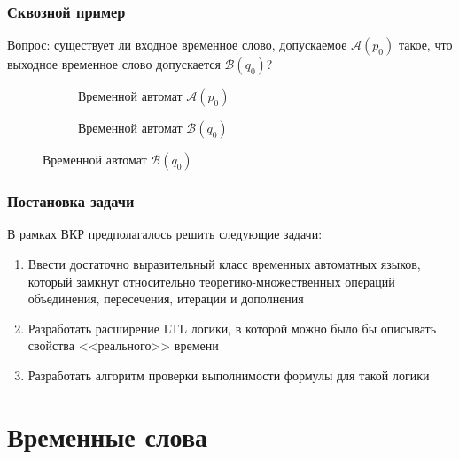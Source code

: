 \documentclass{beamer}
\begin{document}
\begin{frame}
\frametitle{Сквозной пример}



Вопрос: существует ли входное временное слово, допускаемое $\mathcal{A}(p_0)$ такое, что выходное временное слово допускается $\mathcal{B}(q_0)$?


\begin{figure}
\centering
\begin{subfigure}{.5\textwidth}
  \centering

  \caption{Временной автомат $\mathcal{A}(p_0)$}
\end{subfigure}%
\begin{subfigure}{.5\textwidth}
  \centering
  \caption{Временной автомат $\mathcal{B}(q_0)$}
\end{subfigure}
\end{figure}

\end{frame}

\begin{frame}
\frametitle{Постановка задачи}

В рамках ВКР предполагалось решить следующие задачи:
\begin{enumerate}
	\item Ввести достаточно выразительный класс временных автоматных языков, который замкнут относительно теоретико-множественных операций объединения, пересечения, итерации и дополнения
  	
  	\item Разработать расширение LTL логики, в которой можно было бы описывать свойства <<реального>> времени
  	
  	\item Разработать алгоритм проверки выполнимости формулы для такой логики %
\end{enumerate}

\end{frame}

\section{Временные слова}
\end{document}
